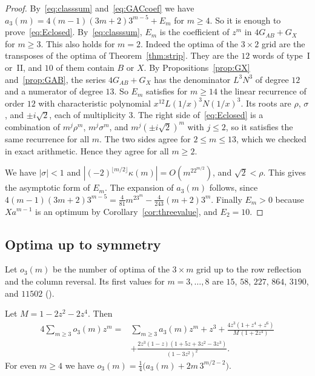 \begin{proof}
By~\eqref{eq:classsum} and~\eqref{eq:GACcoef} we have
$a_3(m)=4(m-1)(3m+2)3^{m-5}+E_m$ for $m\ge4$. So it is enough to
prove~\eqref{eq:Eclosed}. By~\eqref{eq:classsum}, $E_m$ is the coefficient of
$z^m$ in $4G_{AB}+G_X$ for $m\ge3$. This also holds for $m=2$. Indeed the optima
of the $3\times2$ grid are the transposes of the optima of
Theorem~\ref{thm:strip}. They are the $12$ words of type~I or~II, and $10$ of
them contain $B$ or $X$. By Propositions~\ref{prop:GX} and~\ref{prop:GAB}, the
series $4G_{AB}+G_X$ has the denominator $L^3N^3$ of degree $12$ and a numerator
of degree $13$. So $E_m$ satisfies for $m\ge14$ the linear recurrence of order
$12$ with characteristic polynomial $x^{12}L(1/x)^3N(1/x)^3$. Its roots are
$\rho$, $\sigma$, and $\pm i\sqrt2$, each of multiplicity $3$. The right side
of~\eqref{eq:Eclosed} is a combination of $m^j\rho^m$, $m^j\sigma^m$, and
$m^j(\pm i\sqrt2)^m$ with $j\le2$, so it satisfies the same recurrence for all
$m$. The two sides agree for $2\le m\le13$, which we checked in exact
arithmetic. Hence they agree for all $m\ge2$.

We have $|\sigma|<1$ and $|(-2)^{\lfloor m/2\rfloor}\kappa(m)|=O(m^22^{m/2})$,
and $\sqrt2<\rho$. This gives the asymptotic form of $E_m$. The expansion of
$a_3(m)$ follows, since
$4(m-1)(3m+2)3^{m-5}=\frac4{81}m^23^m-\frac4{243}(m+2)3^m$. Finally $E_m>0$
because $Xa^{m-1}$ is an optimum by Corollary~\ref{cor:threevalue}, and
$E_2=10$.
\end{proof}

\subsection{Optima up to symmetry}

Let $o_3(m)$ be the number of optima of the $3\times m$ grid up to the row
reflection and the column reversal. Its first values for $m=3,\dots,8$ are
$15$, $58$, $227$, $864$, $3190$, and $11502$ ().

\begin{theorem}\label{thm:threeorbits}
Let $M=1-2z^2-2z^4$. Then
\begin{align*}
4\sum_{m\ge3}o_3(m)z^m={}&\sum_{m\ge3}a_3(m)z^m+z^3+\frac{4z^3(1+z^4+z^6)}{M\,(1+2z^4)}\\
&+\frac{2z^3(1-z)(1+5z+3z^2-3z^3)}{(1-3z^2)^2}.
\end{align*}
For even $m\ge4$ we have $o_3(m)=\frac14\bigl(a_3(m)+2m\,3^{m/2-2}\bigr)$.
\end{theorem}

